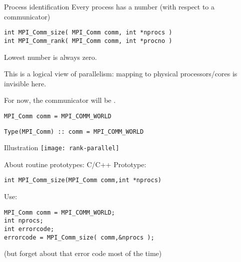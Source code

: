 \begin{numberedframe}{Process identification}
Every process has a number (with respect to a communicator)
\lstset{language=C}
\begin{lstlisting}
int MPI_Comm_size( MPI_Comm comm, int *nprocs )
int MPI_Comm_rank( MPI_Comm comm, int *procno )
\end{lstlisting}
Lowest number is always zero.

This is a logical view of parallelism: mapping to physical
processors/cores is invisible here.

For now, the communicator will be .
\lstset{language=C}
\begin{lstlisting}
MPI_Comm comm = MPI_COMM_WORLD
\end{lstlisting}
\lstset{language=Fortran}
\begin{lstlisting}
Type(MPI_Comm) :: comm = MPI_COMM_WORLD
\end{lstlisting}
\lstset{language=C}
\end{numberedframe}

\begin{numberedframe}{Illustration}
  \texttt{[image: rank-parallel]}
\end{numberedframe}

\begin{numberedframe}{About routine prototypes: C/C++}
  \label{sec:protos}
Prototype:
\lstset{language=C}
\begin{lstlisting}
int MPI_Comm_size(MPI_Comm comm,int *nprocs)
\end{lstlisting}
Use:
\lstset{language=C}
\begin{lstlisting}
MPI_Comm comm = MPI_COMM_WORLD;
int nprocs;
int errorcode;
errorcode = MPI_Comm_size( comm,&nprocs );
\end{lstlisting}
(but forget about that error code most of the time)
\end{numberedframe}

